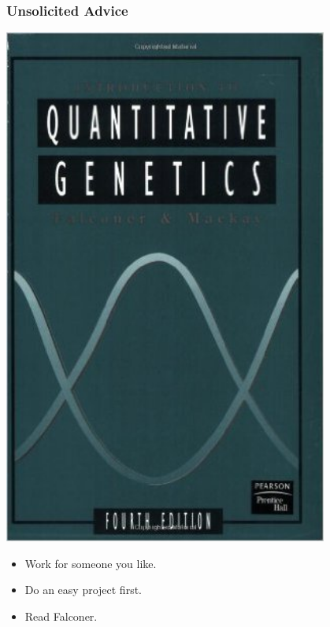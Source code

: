 \documentclass{beamer}
\begin{document}
\begin{frame}\frametitle{Unsolicited Advice}

    \begin{minipage}{0.45\textwidth}
        \begin{center}
            \includegraphics[width = 0.8\textwidth]{falconer}
        \end{center}
    \end{minipage}\hfill
    \begin{minipage}{0.5\textwidth}
        \begin{itemize}
            \item Work for someone you like.
            \item Do an easy project first.
            \item Read Falconer.
        \end{itemize}
    \end{minipage}
    
\end{frame}
\end{document}
